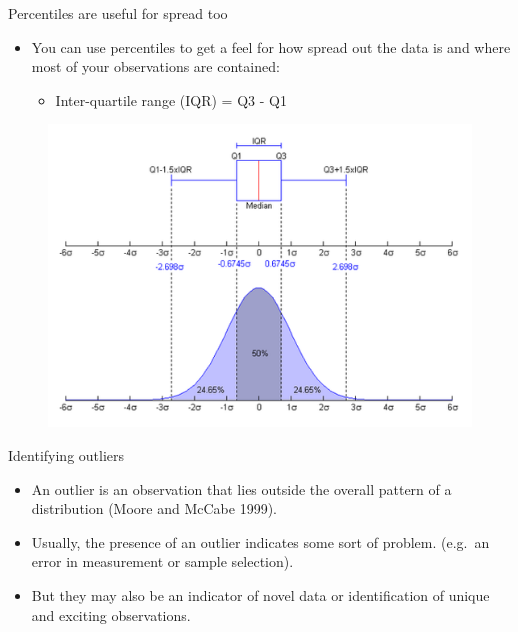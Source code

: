 \documentclass[
  ignorenonframetext,
]{beamer}
\providecommand{\tightlist}{%
  \setlength{\itemsep}{0pt}\setlength{\parskip}{0pt}}
\begin{document}
\begin{frame}{Percentiles are useful for spread too}
\label{percentiles-are-useful-for-spread-too}
\begin{itemize}
\item
  You can use percentiles to get a feel for how spread out the data is
  and where most of your observations are contained:

  \begin{itemize}
  \tightlist
  \item
    Inter-quartile range (IQR) = Q3 - Q1
  \end{itemize}
\end{itemize}

\begin{figure}
\includegraphics[width=0.6\linewidth]{fig/iqr} \end{figure}
\end{frame}

\begin{frame}{Identifying outliers}
\label{identifying-outliers}
\begin{itemize}
\tightlist
\item
  An outlier is an observation that lies outside the overall pattern of
  a distribution (Moore and McCabe 1999).
\end{itemize}

\begin{itemize}
\tightlist
\item
  Usually, the presence of an outlier indicates some sort of problem.
  (e.g.~an error in measurement or sample selection).
\end{itemize}

\begin{itemize}
\tightlist
\item
  But they may also be an indicator of novel data or identification of
  unique and exciting observations.
\end{itemize}
\end{frame}
\end{document}
